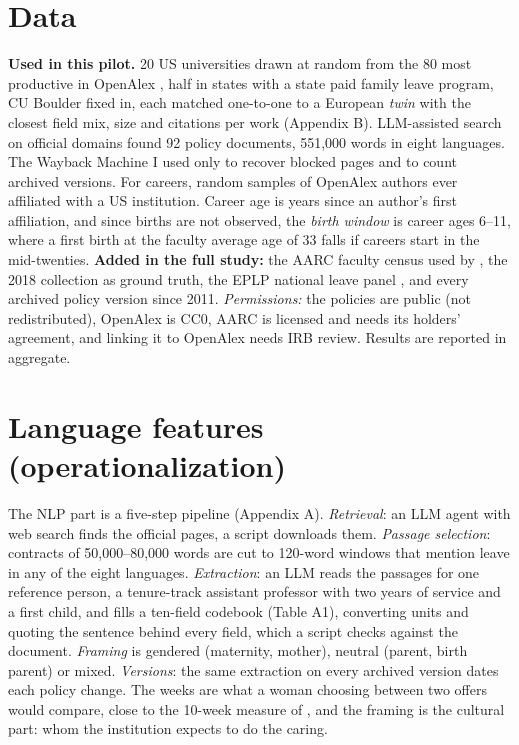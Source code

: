 \documentclass[10pt,twocolumn]{article}
\begin{document}
\section{Data}
\textbf{Used in this pilot.} 20 US universities drawn at random from the 80 most productive in OpenAlex \citep{priem2022}, half in states with a state paid family leave program, CU Boulder fixed in, each matched one-to-one to a European \emph{twin} with the closest field mix, size and citations per work (Appendix B). LLM-assisted search on official domains found 92 policy documents, 551,000 words in eight languages. The Wayback Machine I used only to recover blocked pages and to count archived versions. For careers, random samples of OpenAlex authors ever affiliated with a US institution. Career age is years since an author's first affiliation, and since births are not observed, the \emph{birth window} is career ages 6--11, where a first birth at the faculty average age of 33 \citep{morgan2021} falls if careers start in the mid-twenties. \textbf{Added in the full study:} the AARC faculty census used by \citet{spoon2023}, the 2018 collection \citep{morgan2018} as ground truth, the EPLP national leave panel \citep[21 countries, 1970--2024;][]{spitzer2026}, and every archived policy version since 2011. \emph{Permissions:} the policies are public (not redistributed), OpenAlex is CC0, AARC is licensed and needs its holders' agreement, and linking it to OpenAlex needs IRB review. Results are reported in aggregate.

\section{Language features (operationalization)}
The NLP part is a five-step pipeline (Appendix A). \emph{Retrieval}: an LLM agent with web search finds the official pages, a script downloads them. \emph{Passage selection}: contracts of 50,000--80,000 words are cut to 120-word windows that mention leave in any of the eight languages. \emph{Extraction}: an LLM reads the passages for one reference person, a tenure-track assistant professor with two years of service and a first child, and fills a ten-field codebook (Table A1), converting units and quoting the sentence behind every field, which a script checks against the document. \emph{Framing} is gendered (maternity, mother), neutral (parent, birth parent) or mixed. \emph{Versions}: the same extraction on every archived version dates each policy change. The weeks are what a woman choosing between two offers would compare, close to the 10-week measure of \citet{morgan2021}, and the framing is the cultural part: whom the institution expects to do the caring.
\end{document}
